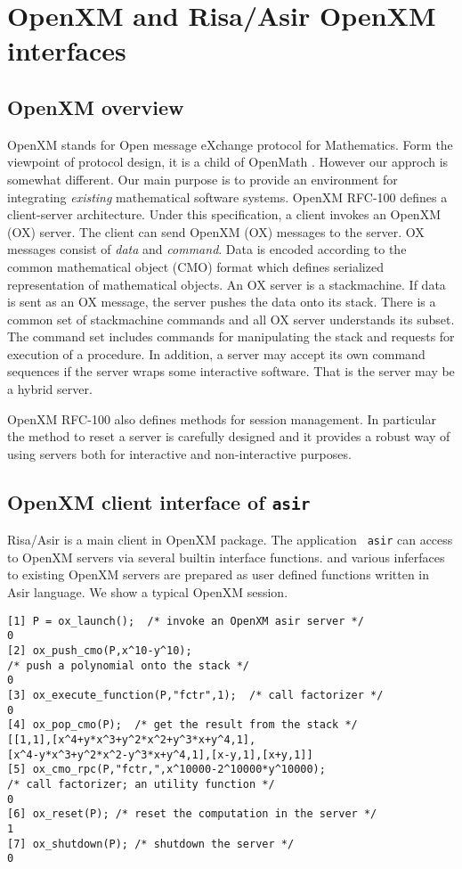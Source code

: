 \documentclass[runningheads]{cl2emult}
\begin{document}
\section{OpenXM and Risa/Asir OpenXM interfaces}

\subsection{OpenXM overview}

OpenXM stands for Open message eXchange protocol for Mathematics.
Form the viewpoint of protocol design, it is a child of OpenMath
\cite{OPENMATH}.  However our approch is somewhat different. Our main
purpose is to provide an environment for integrating {\it existing}
mathematical software systems. OpenXM RFC-100 \cite{RFC100} defines a
client-server architecture.  Under this specification, a client
invokes an OpenXM (OX) server.  The client can send OpenXM (OX)
messages to the server.  OX messages consist of {\it data} and {\it
command}. Data is encoded according to the common mathematical object
(CMO) format which defines serialized representation of mathematical
objects.  An OX server is a stackmachine. If data is sent as an OX
message, the server pushes the data onto its stack. There is a common
set of stackmachine commands and all OX server understands its subset. 
The command set includes commands for manipulating the stack and
requests for execution of a procedure. In addition, a server may
accept its own command sequences if the server wraps some interactive
software. That is the server may be a hybrid server.

OpenXM RFC-100 also defines methods for session management. In particular
the method to reset a server is carefully designed and it provides
a robust way of using servers both for interactive and non-interactive
purposes.

\subsection{OpenXM client interface of {\tt asir}}

Risa/Asir is a main client in OpenXM package.  The application {\tt
asir} can access to OpenXM servers via several builtin interface
functions. and various inferfaces to existing OpenXM servers are
prepared as user defined functions written in Asir language.  We show
a typical OpenXM session.

\begin{verbatim}
[1] P = ox_launch();  /* invoke an OpenXM asir server */
0
[2] ox_push_cmo(P,x^10-y^10);
/* push a polynomial onto the stack */
0
[3] ox_execute_function(P,"fctr",1);  /* call factorizer */
0
[4] ox_pop_cmo(P);  /* get the result from the stack */
[[1,1],[x^4+y*x^3+y^2*x^2+y^3*x+y^4,1],
[x^4-y*x^3+y^2*x^2-y^3*x+y^4,1],[x-y,1],[x+y,1]]
[5] ox_cmo_rpc(P,"fctr,",x^10000-2^10000*y^10000); 
/* call factorizer; an utility function */
0
[6] ox_reset(P); /* reset the computation in the server */
1
[7] ox_shutdown(P); /* shutdown the server */
0
\end{verbatim}
\end{document}
